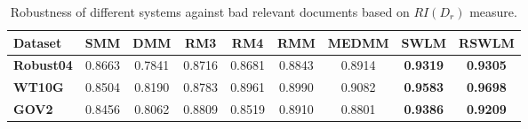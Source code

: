 \begin{table}[tbp]
\centering
\caption{\label{tbl_pp}Robustness of different systems against bad relevant documents based on $RI(D_r)$ measure.}
\begin{adjustbox}{max width=\columnwidth}
\begin{tabular}{lcccccccc}
\toprule
 
\textbf{Dataset} & \textbf{SMM} & 
\textbf{DMM} & \textbf{RM3} & \textbf{RM4} & \textbf{RMM} & \textbf{MEDMM} & \textbf{SWLM} & \textbf{RSWLM} \\ \midrule
\textbf{Robust04} & 0.8663 & 0.7841 & 0.8716 & 0.8681 & 0.8843 & 0.8914 & \textbf{0.9319} & \textbf{0.9305} \\
\textbf{WT10G} & 0.8504 & 0.8190 & 0.8783 & 0.8961 & 0.8990 & 0.9082 & \textbf{0.9583} & \textbf{0.9698} \\
\textbf{GOV2} & 0.8456 & 0.8062 & 0.8809 & 0.8519 & 0.8910 & 0.8801 & \textbf{0.9386} & \textbf{0.9209} \\ \bottomrule
\end{tabular}
\end{adjustbox}
\end{table}
